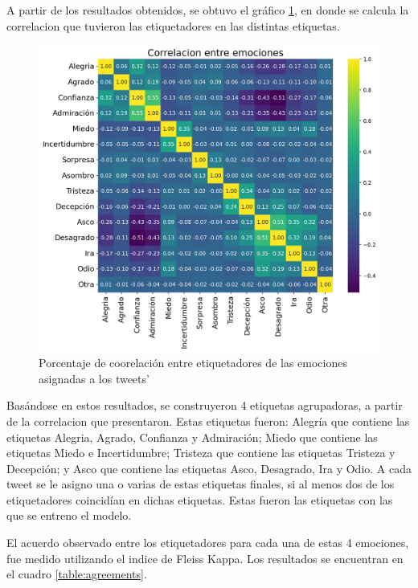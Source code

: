 A partir de los resultados obtenidos, se obtuvo el gráfico \ref{figure:correlacion_emociones}, en donde  se calcula la correlacion que tuvieron las etiquetadores en las distintas etiquetas. 

\begin{figure}[t]
	\centering
	\includegraphics[scale=0.65]{Images & Logos/EDA/emotions_correlations.png} 
	\caption{Porcentaje de coorelación entre etiquetadores de las emociones asignadas a los tweets'}
	\label{figure:correlacion_emociones}
\end{figure}


Basándose en estos resultados, se construyeron 4 etiquetas agrupadoras, a partir de la correlacion que presentaron. Estas etiquetas fueron: Alegría que contiene las etiquetas Alegria, Agrado, Confianza y Admiración; Miedo que contiene las etiquetas Miedo e  Incertidumbre; Tristeza que contiene las etiquetas Tristeza y  Decepción; y 
Asco que contiene las etiquetas Asco, Desagrado, Ira y Odio. A cada tweet se le asigno una o varias de estas etiquetas finales, si al menos dos de los etiquetadores coincidían en dichas etiquetas. Estas fueron las etiquetas con las que se entreno el modelo.

El acuerdo observado entre los etiquetadores para cada una de estas 4 emociones, fue medido utilizando el indice de Fleiss Kappa. Los resultados se encuentran en el cuadro \ref{table:agreements}.




